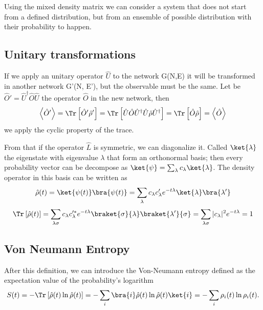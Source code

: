 Using the mixed density matrix we can consider a system that does not start from a defined distribution, but from an ensemble of possible distribution with their probability to happen. 

\subsection{Unitary transformations}
If we apply an unitary operator $\hat U$ to the network G(N,E) it will be transformed in another network G'(N, E'), but the observable must be the same.
Let be $\hat O' = \hat U^\dagger \hat O\hat U$ the operator $\hat O$ in the new network, then
\begin{equation}
    \left< \hat O'\right> = \Tr\left[\hat O'\hat\rho'\right] = \Tr\left[\hat U\hat O \hat U^\dagger \hat U\hat\rho\hat U^\dagger\right] = \Tr\left[\hat O\hat\rho\right] = \left< \hat O\right> 
\end{equation}
we apply the cyclic property of the trace.

From that if the operator $\hat L$ is symmetric, we can diagonalize it. Called $\ket{\lambda}$ the eigenstate with eigenvalue $\lambda$ that form an orthonormal basis; then every probability vector can be decompose as $\ket{\psi} = \sum_\lambda c_\lambda \ket{\lambda}$.
The density operator in this basis can be written as
\begin{equation}
    \hat \rho(t) = \ket{\psi(t)}\bra{\psi(t)} = \sum_\lambda c_\lambda c_\lambda' e^{-t\lambda}\ket{\lambda}\bra{\lambda'}
\end{equation}
\begin{equation}
   \Tr\left[\hat\rho(t)\right] = \sum_{\lambda\sigma}c_\lambda c_\lambda'^*e^{-t\lambda} \braket{\sigma}{\lambda}\braket{\lambda'}{\sigma} = \sum_{\lambda\sigma}|c_\lambda|^2e^{-t\lambda} = 1
\end{equation}


\subsection{Von Neumann Entropy}
After this definition, we can introduce the Von-Neumann entropy defined as the expectation value of the  probability's logarithm
\begin{equation}\label{Von_Neumann_Entropy}
    S(t) = -\Tr \left[\hat\rho(t) \ln \hat\rho(t)\right] = -\sum_i \bra{i}\hat\rho(t) \ln\hat\rho(t)\ket{i} = -\sum_i \rho_i(t)\ln \rho_i(t).
\end{equation}

